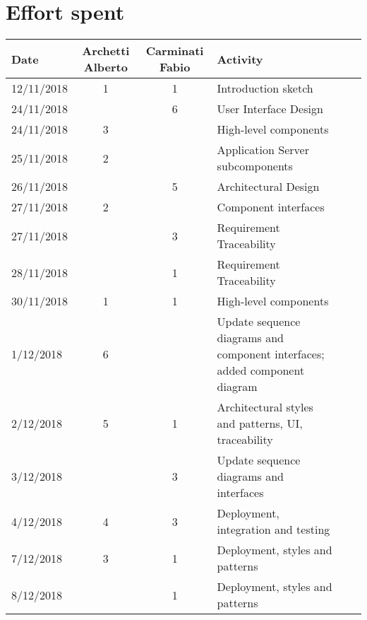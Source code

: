 \documentclass[../DD0.tex]{subfiles}
\newcommand{\addHours}[4]{#1 & #2 & #3 & #4 \\\hline}
\begin{document}
\section*{Effort spent}
\label{sec:effort}
  \begin{table}[h!]
  \centering
  \begin{tabularx}{\linewidth}{|l|c|c|X|Xl}
    \hline
    \textbf{Date}  & \textbf{Archetti Alberto} & \textbf{Carminati Fabio} & \textbf{Activity} \\ \hline

    \addHours{12/11/2018}{1}{1}{Introduction sketch}

    \addHours{24/11/2018}{}{6}{User Interface Design}

    \addHours{24/11/2018}{3}{}{High-level components}

    \addHours{25/11/2018}{2}{}{Application Server subcomponents}

    \addHours{26/11/2018}{}{5}{Architectural Design}

    \addHours{27/11/2018}{2}{}{Component interfaces}

    \addHours{27/11/2018}{}{3}{Requirement Traceability}

    \addHours{28/11/2018}{}{1}{Requirement Traceability}

    \addHours{30/11/2018}{1}{1}{High-level components}

    \addHours{1/12/2018}{6}{}{Update sequence diagrams and component interfaces; added component diagram}

    \addHours{2/12/2018}{5}{1}{Architectural styles and patterns, UI, traceability}

    \addHours{3/12/2018}{}{3}{Update sequence diagrams and interfaces}

    \addHours{4/12/2018}{4}{3}{Deployment, integration and testing}

    \addHours{7/12/2018}{3}{1}{Deployment, styles and patterns}

    \addHours{8/12/2018}{}{1}{Deployment, styles and patterns}
  \end{tabularx}
\end{table}
\end{document}
